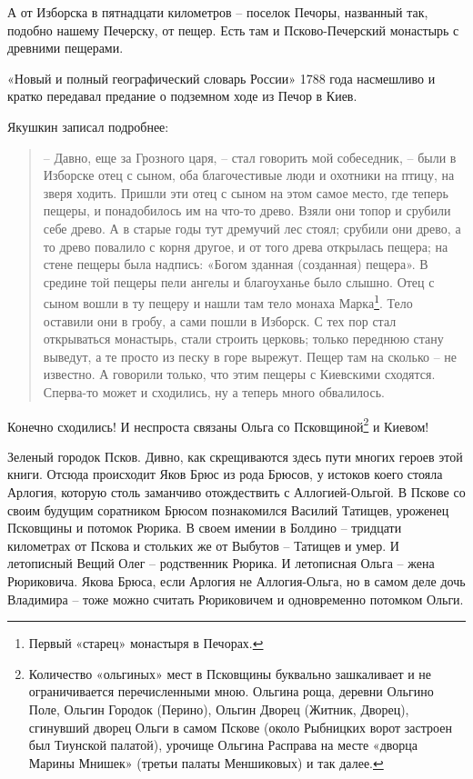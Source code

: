 А от Изборска в пятнадцати километров – поселок Печоры, названный так, подобно нашему Печерску, от пещер. Есть там и Псково-Печерский монастырь с древними пещерами. 

«Новый и полный географический словарь России» 1788 года насмешливо и кратко передавал предание о подземном ходе из Печор в Киев.

Якушкин записал подробнее:

\begin{quotation}
   – Давно, еще за Грозного царя, – стал говорить мой собеседник, – были в Изборске отец с сыном, оба благочестивые люди и охотники на птицу, на зверя ходить. Пришли эти отец с сыном на этом самое место, где теперь пещеры, и понадобилось им на что-то древо. Взяли они топор и срубили себе древо. А в старые годы тут дремучий лес стоял; срубили они древо, а то древо повалило с корня другое, и от того древа открылась пещера; на стене пещеры была надпись: «Богом зданная (созданная) пещера». В средине той пещеры пели ангелы и благоуханье было слышно. Отец с сыном вошли в ту пещеру и нашли там тело монаха Марка\footnote{Первый «старец» монастыря в Печорах.}. Тело оставили они в гробу, а сами пошли в Изборск. С тех пор стал открываться монастырь, стали строить церковь; только переднюю стану выведут, а те просто из песку в горе вырежут. Пещер там на сколько – не известно. А говорили только, что этим пещеры с Киевскими сходятся. Сперва-то может и сходились, ну а теперь много обвалилось.
\end{quotation}

Конечно сходились! И неспроста связаны Ольга со Псковщиной\footnote{Количество «ольгиных» мест в Псковщины буквально зашкаливает и не ограничивается перечисленными мною. Ольгина роща, деревни Ольгино Поле, Ольгин Городок (Перино), Ольгин Дворец (Житник, Дворец), сгинувший дворец Ольги в самом Пскове (около  Рыбницких ворот застроен был Тиунской палатой), урочище Ольгина Расправа на месте «дворца Марины Мнишек» (третьи палаты Меншиковых) и так далее.} и Киевом!

Зеленый городок Псков. Дивно, как скрещиваются здесь пути многих героев этой книги. Отсюда происходит Яков Брюс из рода Брюсов, у истоков коего стояла Арлогия, которую столь заманчиво отождествить с Аллогией-Ольгой. В Пскове со своим будущим соратником Брюсом познакомился Василий Татищев, уроженец Псковщины и потомок Рюрика. В своем имении в Болдино – тридцати километрах от Пскова и стольких же от Выбутов – Татищев и умер. И летописный Вещий Олег – родственник Рюрика. И летописная Ольга – жена Рюриковича. Якова Брюса, если Арлогия не Аллогия-Ольга, но в самом деле дочь Владимира – тоже можно считать Рюриковичем и одновременно потомком Ольги.


